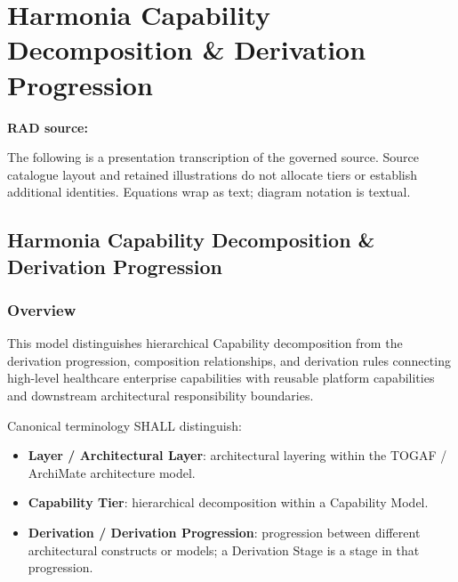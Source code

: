 \chapter{Harmonia Capability Decomposition \& Derivation Progression}\label{rad:tier-model}
\noindent\textbf{RAD source:} \texttt{}

The following is a presentation transcription of the governed source. Source catalogue layout and retained illustrations do not allocate tiers or establish additional identities. Equations wrap as text; diagram notation is textual.

\label{rad:tier-model:1}
\section*{Harmonia Capability Decomposition \& Derivation Progression}
\label{rad:tier-model:3}
\subsection*{Overview}
\label{rad:tier-model:5}

This model distinguishes hierarchical Capability decomposition from the derivation progression, composition relationships, and derivation rules connecting high-level healthcare enterprise capabilities with reusable platform capabilities and downstream architectural responsibility boundaries.

\label{rad:tier-model:7}

Canonical terminology SHALL distinguish:

\label{rad:tier-model:9}

\begin{itemize}

\item 
\textbf{Layer /\allowbreak{} Architectural Layer}: architectural layering within the TOGAF /\allowbreak{} ArchiMate architecture model.



\item 
\textbf{Capability Tier}: hierarchical decomposition within a Capability Model.



\item 
\textbf{Derivation /\allowbreak{} Derivation Progression}: progression between different architectural constructs or models; a Derivation Stage is a stage in that progression.



\end{itemize}
\label{rad:tier-model:13}

